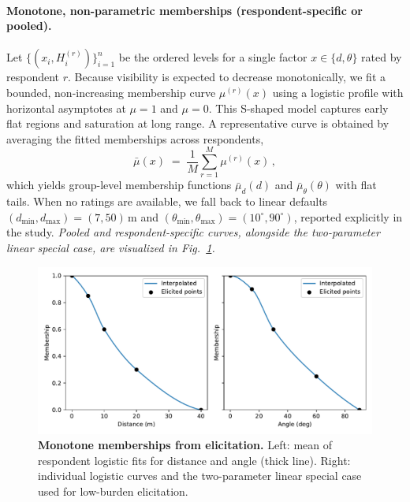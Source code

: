 \documentclass[final,3p,times,review]{elsarticle}
\begin{document}
\paragraph{Monotone, non-parametric memberships (respondent-specific or pooled).}
Let $\{(x_i,H^{(r)}_i)\}_{i=1}^{n}$ be the ordered levels for a single factor $x\!\in\!\{d,\theta\}$ rated by respondent $r$. Because visibility is expected to decrease monotonically, we fit a bounded, non-increasing membership curve $\mu^{(r)}(x)$ using a logistic profile with horizontal asymptotes at $\mu{=}1$ and $\mu{=}0$. This S-shaped model captures early flat regions and saturation at long range. A representative curve is obtained by averaging the fitted memberships across respondents,
\begin{equation}
\bar{\mu}(x) \;=\; \frac{1}{M}\sum_{r=1}^{M} \mu^{(r)}(x) \, ,
\label{eq:pooled-mean}
\end{equation}
which yields group-level membership functions $\bar{\mu}_d(d)$ and $\bar{\mu}_\theta(\theta)$ with flat tails. When no ratings are available, we fall back to linear defaults $(d_{\min},d_{\max})=(7,50)$\,m and $(\theta_{\min},\theta_{\max})=(10^\circ,90^\circ)$, reported explicitly in the study. \textit{Pooled and respondent-specific curves, alongside the two-parameter linear special case, are visualized in Fig.~\ref{fig:memberships}.}

\begin{figure}[t]
  \centering
  \includegraphics[width=\linewidth]{fig6_memberships.pdf}
  \caption{\textbf{Monotone memberships from elicitation.} Left: mean of respondent logistic fits for distance and angle (thick line). Right: individual logistic curves and the two-parameter linear special case used for low-burden elicitation.}
  \label{fig:memberships}
\end{figure}
\end{document}

